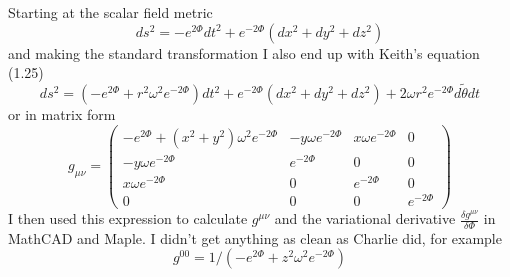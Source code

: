 Starting at the scalar field metric
\[
  ds^2 = - e^{2 \Phi} dt^2 + e^{-2 \Phi} \left( dx^2 + dy^2 + dz^2 \right) 
\]
and making the standard transformation I also end up with Keith's
equation (1.25)
\[
  ds^2 = \left(-e^{2 \Phi} + r^2 \omega^2 e^{-2 \Phi} \right) dt^2 
        + e^{-2 \Phi} \left(dx^2 + dy^2 + dz^2 \right) 
		+ 2 \omega r^2 e^{-2 \Phi} d {\tilde \theta} dt
\]
or in matrix form
\[
g_{\mu\nu} = \left(
             \begin{array}{cccc}
               -e^{2 \Phi} + (x^2 + y^2) \omega^2 e^{-2 \Phi} & 
			   -y \omega e^{-2 \Phi} &
			    x \omega e^{-2 \Phi} &
				0 \\
			   -y \omega e^{-2 \Phi} &
			    e^{-2 \Phi} &
			    0  &
			    0 \\
     		    x \omega e^{-2 \Phi} &
				0 &
				e^{-2 \Phi} &
				0 \\
				0 &
				0 &
				0 & 
				e^{-2 \Phi}
			 \end{array}
			 \right)
\]
I then used this expression to calculate $g^{\mu\nu}$ and the variational derivative
$\frac{\delta g^{\mu\nu}}{\delta \Phi}$ in MathCAD and Maple.
I didn't get anything as clean as Charlie did, for example
\[
g^{00} = 1/\left(-e^{2 \Phi} + z^2 \omega^2 e^{-2 \Phi} \right)
\]


